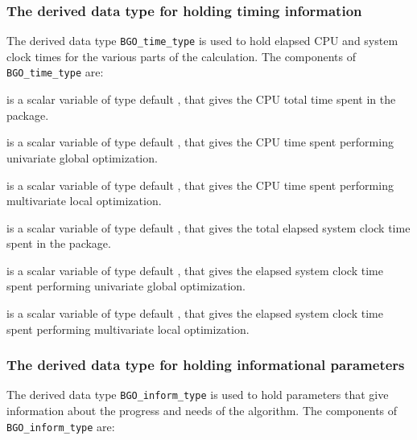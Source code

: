 \documentclass{galahad}
\newcommand{\packagename}{BGO}
\begin{document}
\subsubsection{The derived data type for holding timing
 information}\label{typetime}
The derived data type
{\tt \packagename\_time\_type}
is used to hold elapsed CPU and system clock times for the various parts
of the calculation. The components of
{\tt \packagename\_time\_type}
are:
\begin{description}
 is a scalar variable of type default \real, that gives
 the CPU total time spent in the package.

 is a scalar variable of type default \realdp, that 
gives the CPU time spent performing univariate global optimization.

 is a scalar variable of type default \realdp, that 
gives the CPU time spent performing multivariate local optimization.

 is a scalar variable of type default \real, that gives
 the total elapsed system clock time spent in the package.

 is a scalar variable of type default \realdp, 
that gives the elapsed system clock time spent performing univariate global 
optimization.

 is a scalar variable of type default \realdp, 
that gives the  elapsed system clock time spent performing multivariate local 
optimization.

\end{description}


\subsubsection{The derived data type for holding informational
 parameters}\label{typeinform}
The derived data type
{\tt \packagename\_inform\_type}
is used to hold parameters that give information about the progress and needs
of the algorithm. The components of
{\tt \packagename\_inform\_type}
are:
\end{document}

